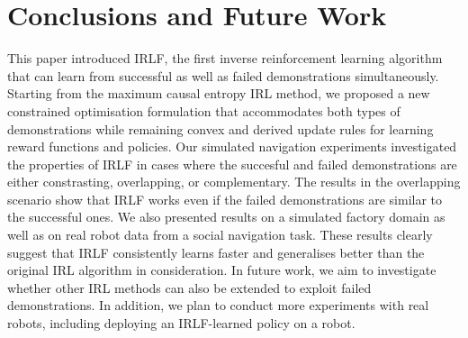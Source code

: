 \documentclass{aamas2016}
\newcommand{\sw}[1]{\textcolor{red}{SW: #1}}
\newcommand{\jm}[1]{\textcolor{blue}{Joao: #1}}
\newcommand{\sw}[1]{}
\newcommand{\jm}[1]{}
\begin{document}

\section{Conclusions and Future Work}


This paper introduced IRLF, the first inverse reinforcement learning algorithm that can learn from successful as well as failed demonstrations simultaneously. Starting from the maximum causal entropy IRL method, we proposed a new constrained optimisation formulation that accommodates both types of demonstrations while remaining convex and derived update rules for learning reward functions and policies. Our simulated navigation experiments investigated the properties of IRLF in cases where the succesful and failed demonstrations are either constrasting, overlapping, or complementary. The results in the overlapping scenario show that IRLF works even if the failed demonstrations are similar to the successful ones. We also presented results on a simulated factory domain as well as on real robot data from a social navigation task. These results clearly suggest that IRLF consistently learns faster and generalises better than the original IRL algorithm in consideration. In future work, we aim to investigate whether other IRL methods can also be extended to exploit failed demonstrations. In addition, we plan to conduct more experiments with real robots, including deploying an IRLF-learned policy on a robot.





	
\end{document}
